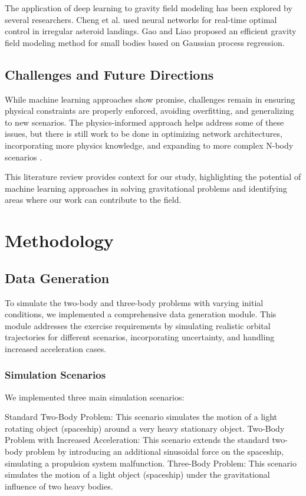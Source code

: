 \documentclass[12pt,a4paper]{article}
\begin{document}
The application of deep learning to gravity field modeling has been explored by several researchers. Cheng et al. \cite{cheng2020} used neural networks for real-time optimal control in irregular asteroid landings. Gao and Liao \cite{gao2019} proposed an efficient gravity field modeling method for small bodies based on Gaussian process regression.

\subsection{Challenges and Future Directions}

While machine learning approaches show promise, challenges remain in ensuring physical constraints are properly enforced, avoiding overfitting, and generalizing to new scenarios. The physics-informed approach helps address some of these issues, but there is still work to be done in optimizing network architectures, incorporating more physics knowledge, and expanding to more complex N-body scenarios \cite{meng2022physics}.

This literature review provides context for our study, highlighting the potential of machine learning approaches in solving gravitational problems and identifying areas where our work can contribute to the field.

\section{Methodology}
\label{sec:methodology}

\subsection{Data Generation}
To simulate the two-body and three-body problems with varying initial conditions, we implemented a comprehensive data generation module. This module addresses the exercise requirements by simulating realistic orbital trajectories for different scenarios, incorporating uncertainty, and handling increased acceleration cases.
\subsubsection{Simulation Scenarios}
We implemented three main simulation scenarios:

Standard Two-Body Problem: This scenario simulates the motion of a light rotating object (spaceship) around a very heavy stationary object.
Two-Body Problem with Increased Acceleration: This scenario extends the standard two-body problem by introducing an additional sinusoidal force on the spaceship, simulating a propulsion system malfunction.
Three-Body Problem: This scenario simulates the motion of a light object (spaceship) under the gravitational influence of two heavy bodies.
\end{document}
